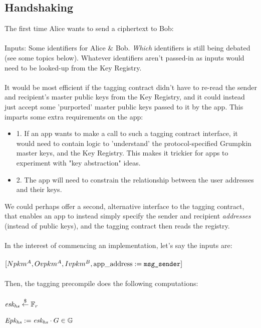 \subsection{Handshaking}

The first time Alice wants to send a ciphertext to Bob:\\
\\
Inputs: Some identifiers for Alice \& Bob. \textit{Which} identifiers is still being debated (see some topics below).
Whatever identifiers aren't passed-in as inputs would need to be looked-up from the Key Registry.\\
\\
It would be most efficient if the tagging contract didn't have to re-read the sender and recipient's master public keys from the Key Registry, and it could instead just accept some 'purported' master public keys passed to it by the app.
This imparts some extra requirements on the app:
\begin{itemize}
    \item 1. If an app wants to make a call to such a tagging contract interface, it would need to contain logic to 'understand' the protocol-specified Grumpkin master keys, and the Key Registry. This makes it trickier for apps to experiment with "key abstraction" ideas. 
    \item 2. The app will need to constrain the relationship between the user addresses and their keys.
\end{itemize}
\noindent
We could perhaps offer a second, alternative interface to the tagging contract, that enables an app to instead simply specify the sender and recipient \textit{addresses} (instead of public keys), and the tagging contract then reads the registry.\\
\\
In the interest of commencing an implementation, let's say the inputs are:\\
\\
$[Npkm^A, Ovpkm^A, Ivpkm^B, \appaddress := \code{msg\_sender}]$\\
\\
Then, the tagging precompile does the following computations:\\
\\
$\eskhs \stackrel{\$}{\leftarrow} \Fr$\\
\\
$\Epkhs := \eskhs \cdot G \in \G$\\
\\
\\
